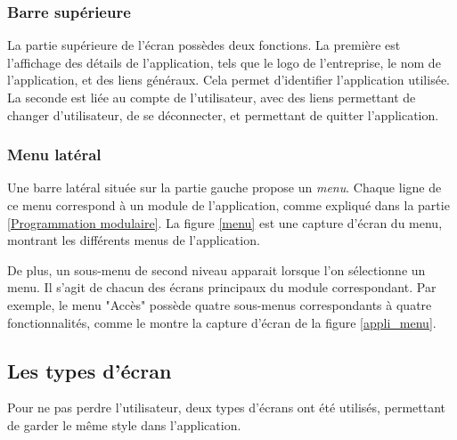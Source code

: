 
\subsubsection{Barre supérieure}

La partie supérieure de l'écran possèdes deux fonctions.
La première est l'affichage des détails de l'application, tels que le logo de l'entreprise, le nom de l'application, et des liens généraux.
Cela permet d'identifier l'application utilisée.
La seconde est liée au compte de l'utilisateur, avec des liens permettant de changer d'utilisateur, de se déconnecter, et permettant de quitter l'application.


\subsubsection{Menu latéral}

Une barre latéral située sur la partie gauche propose un \textit{menu}.
Chaque ligne de ce menu correspond à un module de l'application, comme expliqué dans la partie \ref{Programmation modulaire}.
La figure \ref{menu} est une capture d'écran du menu, montrant les différents menus de l'application.

De plus, un sous-menu de second niveau apparait lorsque l'on sélectionne un menu.
Il s'agit de chacun des écrans principaux du module correspondant.
Par exemple, le menu "Accès" possède quatre sous-menus correspondants à quatre fonctionnalités, comme le montre la capture d'écran de la figure \ref{appli_menu}.


\subsection{Les types d'écran}

Pour ne pas perdre l'utilisateur, deux types d'écrans ont été utilisés, permettant de garder le même style dans l'application.

